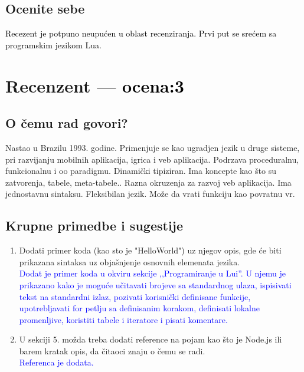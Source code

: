 \documentclass[a4paper]{report}
\newcommand{\odgovor}[1]{\textcolor{black}{#1}}
\newcommand{\odgovorAutora}[1]{\textcolor{blue}{#1}}
\begin{document}
\section{Ocenite sebe}
\odgovor{
Recezent je potpuno neupućen u oblast recenziranja. Prvi put se srećem sa programskim jezikom Lua. 
}
\chapter{Recenzent \odgovor{--- ocena:3} }


\section{O čemu rad govori?}

Nastao u Brazilu 1993. godine. Primenjuje se kao ugradjen jezik u druge sisteme, pri razvijanju mobilnih aplikacija, igrica i veb aplikacija. Podrzava proceduralnu, funkcionalnu i oo paradigmu. Dinami\v cki tipiziran. Ima koncepte kao \v sto su zatvorenja, tabele, meta-tabele.. Razna okruzenja za razvoj veb aplikacija. Ima jednostavnu sintaksu. Fleksibilan jezik. Mo\v ze da vrati funkciju kao povratnu vr.

\section{Krupne primedbe i sugestije}
  
  \begin{enumerate}
    \item  Dodati primer koda (kao sto je "HelloWorld") uz njegov opis, gde \' ce biti prikazana sintaksa uz obja\v snjenje osnovnih elemenata jezika. \\
\odgovorAutora{Dodat je primer koda u okviru sekcije ,,Programiranje u Lui''. U njemu je prikazano kako je moguće učitavati brojeve sa standardnog ulaza, ispisivati tekst na standardni izlaz, pozivati korisnički definisane funkcije, upotrebljavati for petlju sa definisanim korakom, definisati lokalne promenljive, koristiti tabele i iteratore i pisati komentare.}
    \item U sekciji 5. mo\v zda treba dodati reference na pojam kao \v sto je Node.js ili barem kratak opis, da \v citaoci znaju o \v cemu se radi.\\ \odgovorAutora{Referenca je dodata.}
  \end{enumerate}
\end{document}
